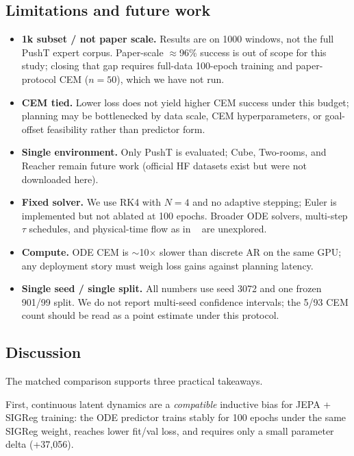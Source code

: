 \subsection{Limitations and future work}
\label{sec:limitations}

\begin{itemize}[leftmargin=*,itemsep=2pt]
\item \textbf{1k subset / not paper scale.}
Results are on 1000 windows, not the full PushT expert corpus.
Paper-scale $\approx$96\% success is out of scope for this study;
closing that gap requires full-data 100-epoch training and
paper-protocol CEM ($n{=}50$), which we have not run.

\item \textbf{CEM tied.}
Lower loss does not yield higher CEM success under this budget;
planning may be bottlenecked by data scale, CEM hyperparameters, or
goal-offset feasibility rather than predictor form.

\item \textbf{Single environment.}
Only PushT is evaluated; Cube, Two-rooms, and Reacher remain future
work (official HF datasets exist but were not downloaded here).

\item \textbf{Fixed solver.}
We use RK4 with $N{=}4$ and no adaptive stepping; Euler is implemented
but not ablated at 100 epochs.
Broader ODE solvers, multi-step $\tau$ schedules, and
physical-time flow as in \PriorODEWorld{}~\cite{liu2026odeworld} are unexplored.

\item \textbf{Compute.}
ODE CEM is $\sim$10$\times$ slower than discrete AR on the same GPU;
any deployment story must weigh loss gains against planning latency.

\item \textbf{Single seed / single split.}
All numbers use seed 3072 and one frozen 901/99 split.
We do not report multi-seed confidence intervals; the 5/93 CEM count
should be read as a point estimate under this protocol.
\end{itemize}

\subsection{Discussion}
\label{sec:discussion}

The matched comparison supports three practical takeaways.

First, continuous latent dynamics are a \emph{compatible} inductive
bias for JEPA + SIGReg training: the ODE predictor trains stably
for 100 epochs under the same SIGReg weight, reaches lower fit/val
loss, and requires only a small parameter delta (+37{,}056).

